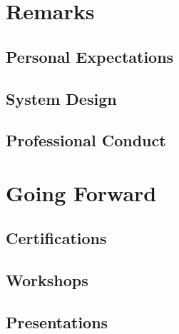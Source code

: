 \documentclass[a4paper]{article}
\def\softskillgraph{soft_skills_radar_graph.png}
\def\hardskillgraph{hard_skills_radar_graph.png}
\begin{document}
\begin{figure}[!h]
    \centering
    \qquad
\end{figure}

\section*{Remarks}

\subsection*{Personal Expectations}
\lipsum[5]

\subsection*{System Design}
\lipsum[4]

\subsection*{Professional Conduct}
\lipsum[6]

\section*{Going Forward}
\subsection*{Certifications}
\lipsum[7]

\subsection*{Workshops}
\lipsum[9]

\subsection*{Presentations}
\lipsum[10]
\end{document}
